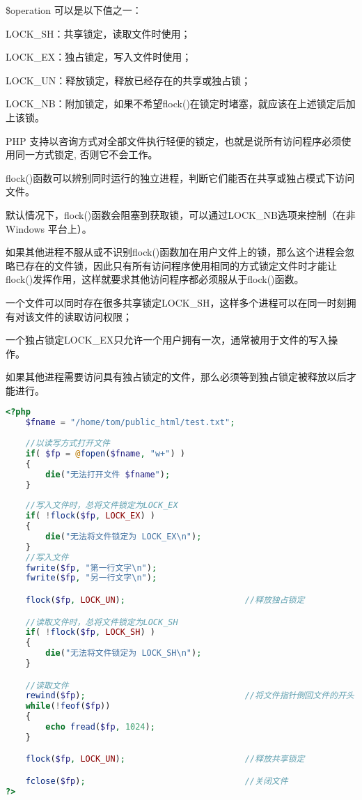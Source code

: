 \$operation 可以是以下值之一：

\begin{compactitem}
\item LOCK\_SH：共享锁定，读取文件时使用；
\item LOCK\_EX：独占锁定，写入文件时使用；
\item LOCK\_UN：释放锁定，释放已经存在的共享或独占锁；
\item LOCK\_NB：附加锁定，如果不希望flock()在锁定时堵塞，就应该在上述锁定后加上该锁。
\end{compactitem}

PHP 支持以咨询方式对全部文件执行轻便的锁定，也就是说所有访问程序必须使用同一方式锁定, 否则它不会工作。



flock()函数可以辨别同时运行的独立进程，判断它们能否在共享或独占模式下访问文件。



默认情况下，flock()函数会阻塞到获取锁，可以通过LOCK\_NB选项来控制（在非 Windows 平台上）。

如果其他进程不服从或不识别flock()函数加在用户文件上的锁，那么这个进程会忽略已存在的文件锁，因此只有所有访问程序使用相同的方式锁定文件时才能让flock()发挥作用，这样就要求其他访问程序都必须服从于flock()函数。

一个文件可以同时存在很多共享锁定LOCK\_SH，这样多个进程可以在同一时刻拥有对该文件的读取访问权限；


一个独占锁定LOCK\_EX只允许一个用户拥有一次，通常被用于文件的写入操作。

如果其他进程需要访问具有独占锁定的文件，那么必须等到独占锁定被释放以后才能进行。



\begin{lstlisting}[language=PHP]
<?php
	$fname = "/home/tom/public_html/test.txt";
	
	//以读写方式打开文件
	if( $fp = @fopen($fname, "w+") )
	{
		die("无法打开文件 $fname");
	}
	
	//写入文件时，总将文件锁定为LOCK_EX
	if( !flock($fp, LOCK_EX) )
	{
		die("无法将文件锁定为 LOCK_EX\n");
	}
	//写入文件
	fwrite($fp, "第一行文字\n");
	fwrite($fp, "另一行文字\n");

	flock($fp, LOCK_UN);						//释放独占锁定

	//读取文件时，总将文件锁定为LOCK_SH
	if( !flock($fp, LOCK_SH) )
	{
		die("无法将文件锁定为 LOCK_SH\n");
	}

	//读取文件
	rewind($fp);								//将文件指针倒回文件的开头
	while(!feof($fp))
	{
		echo fread($fp, 1024);
	}

	flock($fp, LOCK_UN);						//释放共享锁定

	fclose($fp);								//关闭文件
?>
\end{lstlisting}



